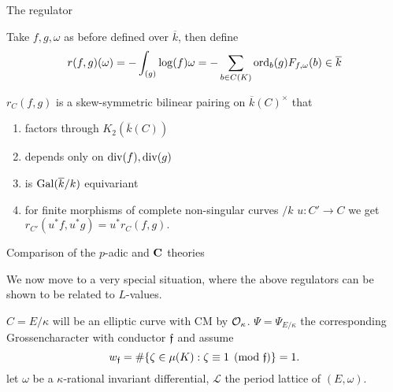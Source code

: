 \begin{frame}{The regulator}
\begin{definition}

Take \(f,g,\omega\) as before defined over \(\overline k\), then define%
\begin{equation*}
r(f,g)(\omega) = -\int_{(g)} \log(f) \omega = -\sum_{b \in C(K)} \operatorname{ord}_b(g) F_{f,\omega}(b) \in \overline k
\end{equation*}
\end{definition}
\pause
\begin{theorem}
\(r_C(f,g)\) is a skew-symmetric bilinear pairing on \(\overline k (C)^\times\) that\leavevmode%
\begin{enumerate}
\item                      factors through \(K_2(\overline k(C))\)

\item                     depends only on \(\operatorname{div}(f),\operatorname{div}(g)\)
\item                     is \(\operatorname{Gal}(\overline{k}/k)\) equivariant%
\item                     for finite morphisms of complete non-singular curves \(/k\) \(u \colon C' \to C\) we get 
\(
r_{C'} (u^* f, u^* g) = u^*r_C(f,g)\text{.}
\)

\end{enumerate}

\end{theorem}
\end{frame}

%
\typeout{************************************************}
\typeout{************************************************}

\begin{frame}{Comparison of the \(p\)-adic and \(\mathbf C\) theories}

We now move to a very special situation, where the above regulators can be shown to be related to \(L\)-values.%
\pause

\(C = E/\kappa\) will be an elliptic curve with CM by \(\mathcal{O}_\kappa\). \(\Psi = \Psi_{E/\kappa}\) the corresponding Grossencharacter with conductor \(\mathfrak{f}\) and assume%
\begin{equation*}
w_{\mathfrak{f}} = \#\{\zeta \in \mu(K) : \zeta \equiv 1 \pmod {\mathfrak{f}}\} = 1\text{.}
\end{equation*}
let \( \omega\) be  a \(\kappa\)-rational invariant differential, \(\mathscr L\) the period lattice of \((E, \omega)\).
\end{frame}

